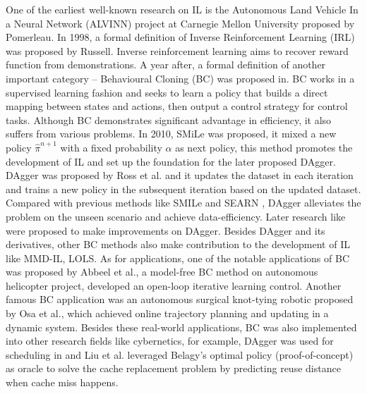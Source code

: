\documentclass[acmsmall]{acmart}
\begin{document}
One of the earliest well-known research on IL is the Autonomous Land Vehicle In a Neural Network (ALVINN) project at Carnegie Mellon University proposed by Pomerleau\cite{pomerleauALVINNAutonomousLand1989}. In 1998, a formal definition of Inverse Reinforcement Learning (IRL) was proposed by Russell\cite{russelllearning1998}. Inverse reinforcement learning aims to recover reward function from demonstrations. A year after, a formal definition of another important category -- Behavioural Cloning (BC) was proposed in\cite{bainFrameworkBehaviouralCloning1999}. 
BC works in a supervised learning fashion and seeks to learn a policy that builds a direct mapping between states and actions, then output a control strategy for control tasks. Although BC demonstrates significant advantage in efficiency, it also suffers from various problems. In 2010, SMiLe\cite{rossEfficientReductionsImitation2010} was proposed, it mixed a new policy $\hat{\pi}^{n+1}$ with a fixed probability $\alpha$ as next policy, this method promotes the development of IL and set up the foundation for the later proposed DAgger\cite{rossReductionImitationLearning2011}. 
DAgger was proposed by Ross et al. and it updates the dataset in each iteration and trains a new policy in the subsequent iteration based on the updated dataset. Compared with previous methods like SMILe \cite{rossEfficientReductionsImitation2010} and SEARN \cite{daumeiiiSearchbasedStructuredPrediction2009a}, DAgger alleviates the problem on the unseen scenario and achieve data-efficiency. Later research like\cite{rossReinforcementImitationLearning2014,sunDeeplyAggreVaTeDDifferentiable2017,liu2020imitationcache} were proposed to make improvements on DAgger. Besides DAgger and its derivatives, other BC methods also make contribution to the development of IL like MMD-IL\cite{kimMaximumMeanDiscrepancy2013}, LOLS\cite{changLearningSearchBetter2015}.
As for applications, one of the notable applications of BC was proposed by Abbeel et al.\cite{abbeelAutonomousHelicopterAerobatics2010}, a model-free BC method on autonomous helicopter project, developed an open-loop iterative learning control. Another famous BC application was an autonomous surgical knot-tying robotic proposed by Osa et al.\cite{osaOnlineTrajectoryPlanning2018}, which achieved online trajectory planning and updating in a dynamic system. Besides these real-world applications, BC was also implemented into other research fields like cybernetics, for example, DAgger was used for scheduling in \cite{wang2021minimizing} and Liu et al. leveraged Belagy's optimal policy (proof-of-concept) as oracle to solve the cache replacement problem by predicting reuse distance when cache miss happens\cite{liu2020imitationcache}. 
\end{document}
